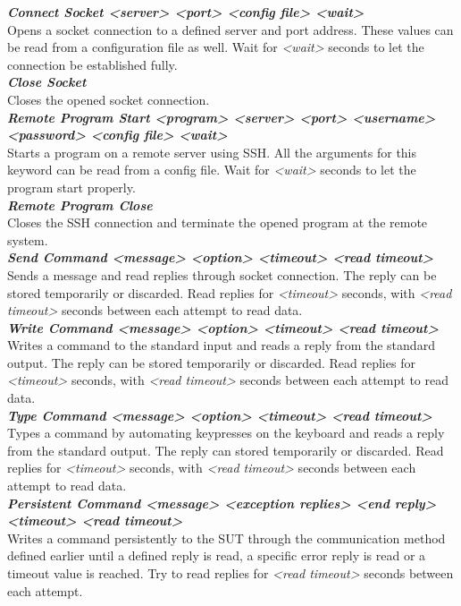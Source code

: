 \documentclass[english,12pt,a4paper,pdftex,elec,utf8]{aaltothesis}
\begin{document}
\textit{\textbf{Connect Socket  <server> <port> <config file> <wait>}}\\
Opens a socket connection to a defined server and port address. These values can be read from a configuration file as well. Wait for \textit{<wait>} seconds to let the connection be established fully.\\
\textit{\textbf{Close Socket}}\\
Closes the opened socket connection.\\
\textit{\textbf{Remote Program Start  <program> <server> <port> <username> <password> <config file> <wait>}}\\
Starts a program on a remote server using SSH. All the arguments for this keyword can be read from a config file. Wait for \textit{<wait>} seconds to let the program start properly.\\
\textit{\textbf{Remote Program Close}}\\
Closes the SSH connection and terminate the opened program at the remote system.\\
\textit{\textbf{Send Command  <message> <option> <timeout> <read timeout>}}\\
Sends a message and read replies through socket connection. The reply can be stored temporarily or discarded. Read replies for \textit{<timeout>} seconds, with \textit{<read timeout>} seconds between each attempt to read data.\\
\textit{\textbf{Write Command  <message> <option> <timeout> <read timeout>}}\\
Writes a command to the standard input and reads a reply from the standard output. The reply can be stored temporarily or discarded. Read replies for \textit{<timeout>} seconds, with \textit{<read timeout>} seconds between each attempt to read data.\\
\textit{\textbf{Type Command  <message> <option> <timeout> <read timeout>}}\\
Types a command by automating keypresses on the keyboard and reads a reply from the standard output. The reply can stored temporarily or discarded. Read replies for \textit{<timeout>} seconds, with \textit{<read timeout>} seconds between each attempt to read data. \\
\textit{\textbf{Persistent Command  <message> <exception replies> <end reply> <timeout> <read timeout>}}\\
Writes a command persistently to the SUT through the communication method defined earlier until a defined reply is read, a specific error reply is read or a timeout value is reached.  Try to read replies for \textit{<read timeout>} seconds between each attempt.\\
\end{document}
